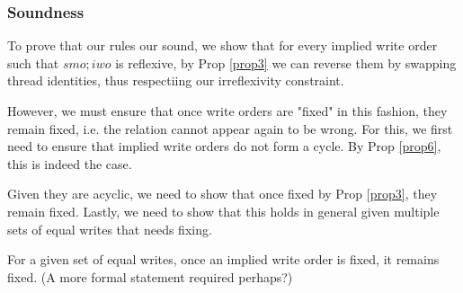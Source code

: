     \subsubsection{Soundness}

        To prove that our rules our sound, we show that for every implied write order such that $smo;iwo$ is reflexive, by Prop \ref{prop3} we can reverse them by swapping thread identities, thus respectiing our irreflexivity constraint. 
        
        However, we must ensure that once write orders are "fixed" in this fashion, they remain fixed, i.e. the relation cannot appear again to be wrong. 
        For this, we first need to ensure that implied write orders do not form a cycle. By Prop \ref{prop6}, this is indeed the case. 
        
        Given they are acyclic, we need to show that once fixed by Prop \ref{prop3}, they remain fixed. 
        Lastly, we need to show that this holds in general given multiple sets of equal writes that needs fixing.  


        \begin{lemma}
            For a given set of equal writes, once an implied write order is fixed, it remains fixed. 
            (A more formal statement required perhaps?)
        \end{lemma}
            
